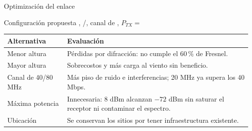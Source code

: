 \begin{frame}{Optimización del enlace}
  \begin{block}{Configuración propuesta}
    \EAequipo, \EAunoAlt/\EAdosAlt, canal de \EAcanal, $P_{TX}=$ \EAptx
  \end{block}
  \small
  \begin{tabularx}{\textwidth}{@{}lL@{}}
    \toprule
    \textbf{Alternativa} & \textbf{Evaluación} \\ \midrule
    Menor altura & Pérdidas por difracción: no cumple el 60\,\% de Fresnel. \\
    Mayor altura & Sobrecostos y más carga al viento sin beneficio. \\
    Canal de 40/80 MHz & Más piso de ruido e interferencias; 20 MHz ya supera los 40 Mbps. \\
    Máxima potencia & Innecesaria: 8 dBm alcanzan $-72$ dBm sin saturar el receptor ni contaminar el espectro. \\
    Ubicación & Se conservan los sitios por tener infraestructura existente. \\
    \bottomrule
  \end{tabularx}
\end{frame}
